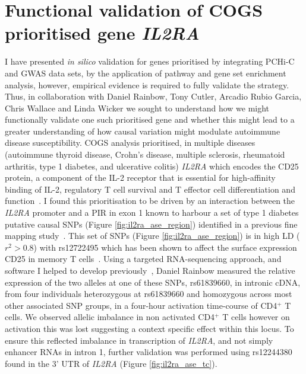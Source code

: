 \documentclass[a4paper,11pt]{report}
\begin{document}
\section{Functional validation of COGS prioritised gene \textit{IL2RA}}
\label{section:il2ra}
I have presented \textit{in silico} validation for genes prioritised by integrating PCHi-C and GWAS data sets, by the application of pathway and gene set enrichment analysis, however, empirical evidence is required to fully validate the strategy. Thus, in collaboration with Daniel Rainbow, Tony Cutler, Arcadio Rubio Garcia, Chris Wallace and Linda Wicker we sought to understand how we might functionally validate one such prioritised gene and whether this might lead to a greater understanding of how causal variation might modulate autoimmune disease susceptibility. COGS analysis prioritised, in multiple diseases (autoimmune thyroid disease, Crohn's disease, multiple sclerosis, rheumatoid arthritis, type 1 diabetes, and ulcerative colitis) \textit{IL2RA} which encodes the CD25 protein,  a component of the IL-2 receptor that is essential for high-affinity binding of IL-2, regulatory T cell survival and T effector cell differentiation and function~\citep{LiaoLinLeonard2013}. I found this prioritisation to be driven by an interaction between the \textit{IL2RA} promoter and a PIR in exon 1 known to harbour a set of type 1 diabetes putative causal SNPs (Figure \ref{fig:il2ra_ase_region}) identified in a previous fine mapping study~\citep{WallaceCutlerPontikosEtAl2015}. This  set of SNPs (Figure \ref{fig:il2ra_ase_region}) is in high LD ($r^{2} > 0.8$) with rs12722495 which has been shown to affect the surface expression CD25 in memory T cells~\citep{DendrouPlagnolFungEtAl2009}. Using a targeted RNA-sequencing approach, and software I helped to develop previously~\citep{RainbowYangBurrenEtAl2015}, Daniel Rainbow measured the relative expression of the two alleles at one of these SNPs, rs61839660, in intronic cDNA, from four individuals heterozygous at rs61839660 and homozygous across most other associated SNP groups, in a four-hour activation time-course of CD4$^{+}$ T cells. We observed allelic imbalance in non activated CD4$^{+}$ T cells however on activation this was lost suggesting a context specific effect within this locus. To ensure this reflected imbalance in transcription of \textit{IL2RA}, and not simply enhancer RNAs in intron 1,  further validation was performed using rs12244380 found in the 3' UTR of \textit{IL2RA} (Figure \ref{fig:il2ra_ase_tc}). 
\end{document}
